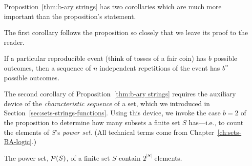 Proposition~\ref{thm:b-ary strings} has two corollaries which are much more important than the proposition's statement.

\smallskip

The first corollary follows the proposition so closely that we leave its proof to the reader.

\begin{prop}
\label{thm:identical-events}
If a particular reproducible event (think of tosses of a fair coin) has $b$ possible outcomes, then a sequence of $n$ independent repetitions of the event has $b^n$ possible outcomes.
\end{prop}

\smallskip

 

The second corollary of Proposition~\ref{thm:b-ary strings} requires the auxiliary device of the {\em characteristic sequence} of a set, which we introduced in Section~\ref{sec:sets-strings-functions}.  Using this device, we invoke the case $b=2$ of the proposition to determine how many subsets a finite set $S$ has---i.e., to count the elements of $S$'s {\em power set}.  (All technical terms come from Chapter~\ref{ch:sets-BA-logic}.)

\begin{prop}
\label{thm:power-sets}
The power set, $\mbox{$\cal P$}(S)$, of a finite set $S$ contain $2^{|S|}$ elements.
\end{prop}

